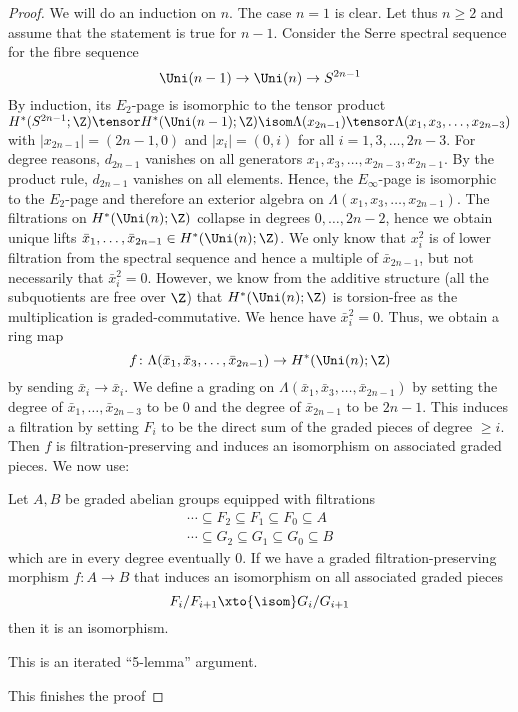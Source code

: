 \begin{proof}
	We will do an induction on $n$.
	The case $n = 1$ is clear.
	Let thus $n \geq 2$ and assume that the statement is true for $n - 1$.
	Consider the Serre spectral sequence for the fibre sequence
	\begin{equation*}
		\Uni(n - 1) \to \Uni(n) \to S^{2n - 1}
	\end{equation*}
	By induction, its $E_2$-page is isomorphic to the tensor product $H^*(S^{2n - 1}; \Z) \tensor H^*(\Uni(n - 1); \Z) \isom \Lambda(x_{2n - 1}) \tensor \Lambda(x_1, x_3, \ldots, x_{2n - 3})$ with $|x_{2n - 1}| = (2n - 1, 0)$ and $|x_i| = (0, i)$ for all $i = 1, 3, \ldots, 2n - 3$.
	For degree reasons, $d_{2n - 1}$ vanishes on all generators $x_1, x_3, \ldots, x_{2n - 3}, x_{2n - 1}$.
	By the product rule, $d_{2n - 1}$ vanishes on all elements.
	Hence, the $E_\infty$-page is isomorphic to the $E_2$-page and therefore an exterior algebra on $\Lambda(x_1, x_3, \ldots, x_{2n - 1})$.
	The filtrations on $H^*(\Uni(n); \Z)$ collapse in degrees $0, \ldots, 2n - 2$, hence we obtain unique lifts $\bar{x}_1, \ldots, \bar{x}_{2n - 1} \in H^*(\Uni(n); \Z)$.
	We only know that $x_i^2$ is of lower filtration from the spectral sequence and hence a multiple of $\bar{x}_{2n - 1}$, but not necessarily that $\bar{x}_i^2 = 0$.
	However, we know from the additive structure (all the subquotients are free over $\Z$) that $H^*(\Uni(n); \Z)$ is torsion-free as the multiplication is graded-commutative.
	We hence have $\bar{x}_i^2 = 0$.
	Thus, we obtain a ring map
	\begin{equation*}
		f\colon \Lambda(\bar{x}_1, \bar{x}_3, \ldots, \bar{x}_{2n - 1}) \to H^*(\Uni(n); \Z)
	\end{equation*}
	by sending $\bar{x}_i \to \bar{x}_i$.
	We define a grading on $\Lambda(\bar{x}_1, \bar{x}_3, \ldots, \bar{x}_{2n - 1})$ by setting the degree of $\bar{x}_1, \ldots, \bar{x}_{2n - 3}$ to be 0 and the degree of $\bar{x}_{2n - 1}$ to be $2n - 1$.
	This induces a filtration by setting $F_i$ to be the direct sum of the graded pieces of degree $\geq i$. 
	Then $f$ is filtration-preserving and induces an isomorphism on associated graded pieces.
	We now use:
	\begin{lemma}
		Let $A, B$ be graded abelian groups equipped with filtrations
		\begin{gather*}
			\cdots \subseteq F_2 \subseteq F_1 \subseteq F_0 \subseteq A \\
			\cdots \subseteq G_2 \subseteq G_1 \subseteq G_0 \subseteq B
		\end{gather*}
		which are in every degree eventually 0.
		If we have a graded filtration-preserving morphism $f\colon A \to B$ that induces an isomorphism on all associated graded pieces
		\begin{equation*}
			F_i / F_{i + 1} \xto{\isom} G_i / G_{i + 1}
		\end{equation*}
		then it is an isomorphism.
	\end{lemma}
	\begin{smallproof}
		This is an iterated \enquote{5-lemma} argument.
	\end{smallproof}
	This finishes the proof
\end{proof}
